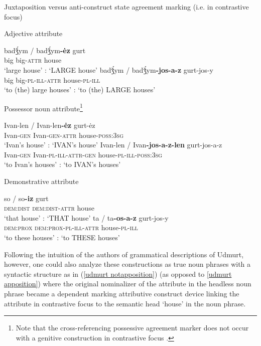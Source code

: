 \begin{exe}
\ex \rm{Juxtaposition versus anti\hyp{}construct state agreement marking (i.e. in contrastive focus) \citep{kelmakov-etal1999,winkler2001}}
\begin{xlist}
\ex	\rm{Adjective attribute}
\begin{xlist}
\ex 	
\gll	badǯ́ym / badǯ́ym\textbf{-ėz} gurt\\
	big {} big-\textsc{attr} house\\
\glt	‘large house’ : ‘LARGE house’
\ex	
\gll	badǯ́ym / badǯ́ym\textbf{-jos-a-z} gurt-jos-y\\
	big {} big-\textsc{pl}-\textsc{ill}-\textsc{attr} house-\textsc{pl}-\textsc{ill}\\
\glt	‘to (the) large houses’ : ‘to (the) LARGE houses’
\end{xlist}
\ex	\rm{Possessor noun attribute}\footnote{Note that the cross-referencing possessive agreement marker does not occur with a genitive construction in contrastive focus \citep[81]{kelmakov-etal1999}.}
\begin{xlist}
\ex	
\gll	Ivan-len / Ivan-len\textbf{-ėz} gurt-ėz\\
	Ivan-\textsc{gen} {} Ivan-\textsc{gen}-\textsc{attr} house-\textsc{poss:3sg}\\
\glt	‘Ivan's house’ : ‘IVAN's house’
\ex	
\gll	Ivan-len / Ivan\textbf{-jos-a-z-len} gurt-jos-a-z\\
	Ivan-\textsc{gen} {} Ivan-\textsc{pl}-\textsc{ill}-\textsc{attr}-\textsc{gen} house-\textsc{pl}-\textsc{ill}-\textsc{poss:3sg}\\
\glt	‘to Ivan's houses’ : ‘to IVAN's houses’
\end{xlist}
\ex	\rm{Demonstrative attribute} \label{udmurt det dem}
\begin{xlist}
\ex	
\gll	so / so\textbf{-iz} gurt\\
 	\textsc{dem:dist} {} \textsc{dem:dist}-\textsc{attr} house\\
\glt	‘that house’ : ‘THAT house’
\ex 	
\gll	ta / ta\textbf{-os-a-z} gurt-jos-y\\
	\textsc{dem:prox} {} \textsc{dem:prox}-\textsc{pl}-\textsc{ill}-\textsc{attr} house-\textsc{pl}-\textsc{ill}\\
\glt	 ‘to these houses’ : ‘to THESE houses’
\end{xlist}
\end{xlist}
\end{exe}
Following the intuition of the authors of grammatical descriptions of Udmurt, however, one could also analyze these constructions as true noun phrases with a syntactic structure as in (\ref{udmurt notapposition}) (as opposed to \ref{udmurt apposition}) where the original nominalizer of the attribute in the headless noun phrase became a dependent marking attributive construct device linking the attribute in contrastive focus to the semantic head ‘house’ in the noun phrase.
